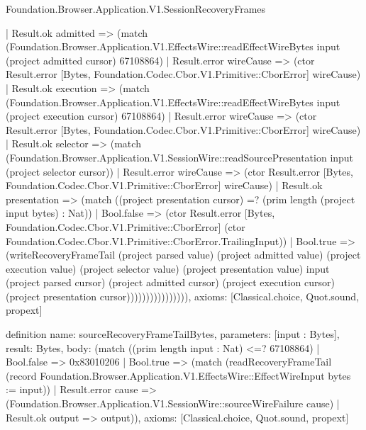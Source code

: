 \begin{lexlean}{Foundation.Browser.Application.V1.SessionRecoveryFrames}
\begin{semanticmodule}
{                      | Result.ok admitted => (match (Foundation.Browser.Application.V1.EffectsWire::readEffectWireBytes input (project admitted cursor) 67108864)
                        | Result.error wireCause => (ctor Result.error [Bytes, Foundation.Codec.Cbor.V1.Primitive::CborError] wireCause)
                        | Result.ok execution => (match (Foundation.Browser.Application.V1.EffectsWire::readEffectWireBytes input (project execution cursor) 67108864)
                          | Result.error wireCause => (ctor Result.error [Bytes, Foundation.Codec.Cbor.V1.Primitive::CborError] wireCause)
                          | Result.ok selector => (match (Foundation.Browser.Application.V1.SessionWire::readSourcePresentation input (project selector cursor))
                            | Result.error wireCause => (ctor Result.error [Bytes, Foundation.Codec.Cbor.V1.Primitive::CborError] wireCause)
                            | Result.ok presentation => (match ((project presentation cursor) =? (prim length (project input bytes) : Nat))
                              | Bool.false => (ctor Result.error [Bytes, Foundation.Codec.Cbor.V1.Primitive::CborError] (ctor Foundation.Codec.Cbor.V1.Primitive::CborError.TrailingInput))
                              | Bool.true => (writeRecoveryFrameTail (project parsed value) (project admitted value) (project execution value) (project selector value) (project presentation value) input (project parsed cursor) (project admitted cursor) (project execution cursor) (project presentation cursor)))))))))))))))),
  axioms: [Classical.choice, Quot.sound, propext]
}

definition{
  name: sourceRecoveryFrameTailBytes,
  parameters: [input : Bytes],
  result: Bytes,
  body: (match ((prim length input : Nat) <=? 67108864)
    | Bool.false => 0x83010206
    | Bool.true => (match (readRecoveryFrameTail (record Foundation.Browser.Application.V1.EffectsWire::EffectWireInput {bytes := input}))
      | Result.error cause => (Foundation.Browser.Application.V1.SessionWire::sourceWireFailure cause)
      | Result.ok output => output)),
  axioms: [Classical.choice, Quot.sound, propext]
}
\end{semanticmodule}
\end{lexlean}
